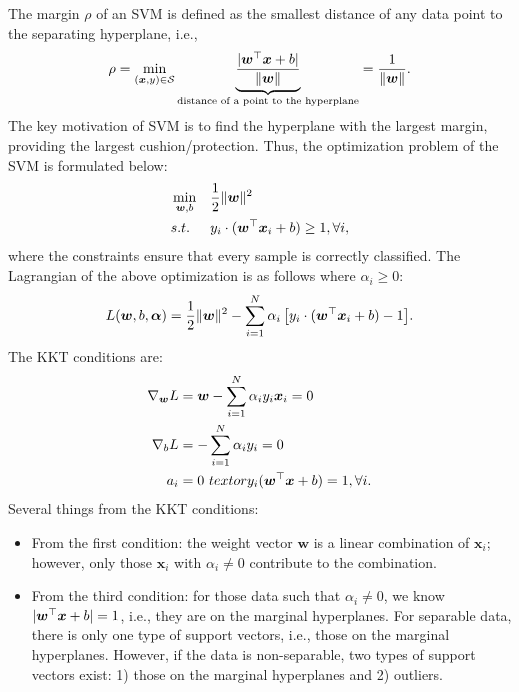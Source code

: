         The margin $\rho$ of an SVM is defined as the smallest distance of any data point to the separating hyperplane, i.e., 
            \begin{equation}
                \rho = \min_{(\bm{x}, y) \in \mathcal{S}} \underbrace{\frac{| \bm{w}^\top \bm{x} + b |}{\lVert\bm{w}\rVert}}_{\text{distance of a point to the hyperplane}} = \frac{1}{\lVert\bm{w}\rVert}.
            \end{equation}
        The key motivation of SVM is to find the hyperplane with the largest margin, providing the largest cushion/protection.
        Thus, the optimization problem of the SVM is formulated below:
            \begin{equation}
                \begin{aligned}
                    & \min_{\bm{w}, b} & & \frac{1}{2}\lVert\bm{w}\rVert^2 \\
                    & s.t.             & & y_i \cdot (\bm{w}^\top \bm{x}_i + b) \ge 1, \forall i,
                \end{aligned}
            \end{equation}
        where the constraints ensure that every sample is correctly classified.
        The Lagrangian of the above optimization is as follows where $\alpha_i \ge 0$:
            \begin{equation}
                L(\bm{w}, b, \bm{\alpha}) = \frac{1}{2}\lVert\bm{w}\rVert^2 - \sum_{i=1}^{N}{\alpha_i \left[ y_i \cdot (\bm{w}^\top \bm{x}_i + b) - 1\right]}.
            \end{equation}
        The KKT conditions are:
            \begin{equation}
                \begin{aligned}
                    \nabla_{\bm{w}} L & = \bm{w} - \sum_{i=1}^{N}{\alpha_i y_i \bm{x}_i} = 0 \\
                    \nabla_{b} L & = -\sum_{i=1}^{N}{\alpha_i y_i} = 0 \\
                    a_i & = 0 \ text{ or } y_i(\bm{w}^\top \bm{x} + b) = 1, \forall i.
                \end{aligned}
            \end{equation}
        Several things from the KKT conditions:
            \begin{itemize}
                \item From the first condition: the weight vector $\bm{w}$ is a linear combination of $\bm{x}_i$; however, only those $\bm{x}_i$ with $\alpha_i \ne 0$ contribute to the combination.
                \item From the third condition: for those data such that $\alpha_i \ne 0$, we know $| \bm{w}^\top \bm{x} + b | = 1$, i.e., they are on the marginal hyperplanes.
                For separable data, there is only one type of support vectors, i.e., those on the marginal hyperplanes. However, if the data is non-separable, two types of support vectors exist: 1) those on the marginal hyperplanes and 2) outliers. 
            \end{itemize}
